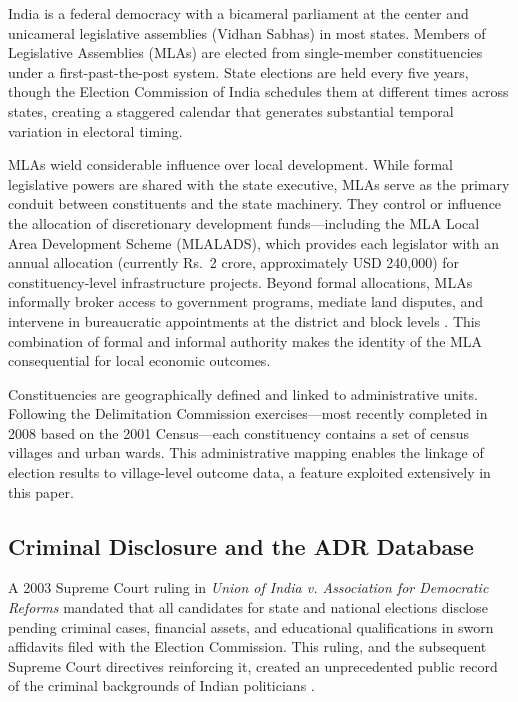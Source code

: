 \documentclass[12pt]{article}
\begin{document}
India is a federal democracy with a bicameral parliament at the center and unicameral legislative assemblies (Vidhan Sabhas) in most states. Members of Legislative Assemblies (MLAs) are elected from single-member constituencies under a first-past-the-post system. State elections are held every five years, though the Election Commission of India schedules them at different times across states, creating a staggered calendar that generates substantial temporal variation in electoral timing.

MLAs wield considerable influence over local development. While formal legislative powers are shared with the state executive, MLAs serve as the primary conduit between constituents and the state machinery. They control or influence the allocation of discretionary development funds---including the MLA Local Area Development Scheme (MLALADS), which provides each legislator with an annual allocation (currently Rs.\ 2 crore, approximately USD 240,000) for constituency-level infrastructure projects. Beyond formal allocations, MLAs informally broker access to government programs, mediate land disputes, and intervene in bureaucratic appointments at the district and block levels \citep{min2015}. This combination of formal and informal authority makes the identity of the MLA consequential for local economic outcomes.

Constituencies are geographically defined and linked to administrative units. Following the Delimitation Commission exercises---most recently completed in 2008 based on the 2001 Census---each constituency contains a set of census villages and urban wards. This administrative mapping enables the linkage of election results to village-level outcome data, a feature exploited extensively in this paper.

\subsection{Criminal Disclosure and the ADR Database}

A 2003 Supreme Court ruling in \textit{Union of India v. Association for Democratic Reforms} mandated that all candidates for state and national elections disclose pending criminal cases, financial assets, and educational qualifications in sworn affidavits filed with the Election Commission. This ruling, and the subsequent Supreme Court directives reinforcing it, created an unprecedented public record of the criminal backgrounds of Indian politicians \citep{vaishnav2017}.
\end{document}
